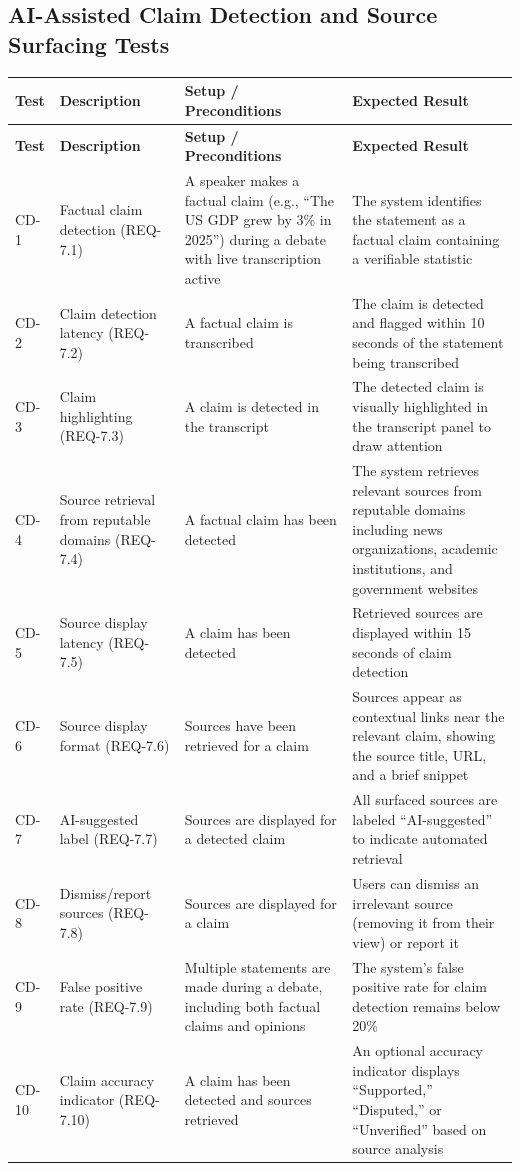 \documentclass[12pt]{article}
\begin{document}
\subsection{AI-Assisted Claim Detection and Source Surfacing Tests}

\begin{longtable}{|p{1.5cm}|p{3cm}|p{4cm}|p{4cm}|}
\hline
\textbf{Test} & \textbf{Description} & \textbf{Setup / Preconditions} & \textbf{Expected Result} \\
\hline
\endfirsthead
\hline
\textbf{Test} & \textbf{Description} & \textbf{Setup / Preconditions} & \textbf{Expected Result} \\
\hline
\endhead
CD-1 & Factual claim detection (REQ-7.1) & A speaker makes a factual claim (e.g., ``The US GDP grew by 3\% in 2025'') during a debate with live transcription active & The system identifies the statement as a factual claim containing a verifiable statistic \\
\hline
CD-2 & Claim detection latency (REQ-7.2) & A factual claim is transcribed & The claim is detected and flagged within 10 seconds of the statement being transcribed \\
\hline
CD-3 & Claim highlighting (REQ-7.3) & A claim is detected in the transcript & The detected claim is visually highlighted in the transcript panel to draw attention \\
\hline
CD-4 & Source retrieval from reputable domains (REQ-7.4) & A factual claim has been detected & The system retrieves relevant sources from reputable domains including news organizations, academic institutions, and government websites \\
\hline
CD-5 & Source display latency (REQ-7.5) & A claim has been detected & Retrieved sources are displayed within 15 seconds of claim detection \\
\hline
CD-6 & Source display format (REQ-7.6) & Sources have been retrieved for a claim & Sources appear as contextual links near the relevant claim, showing the source title, URL, and a brief snippet \\
\hline
CD-7 & AI-suggested label (REQ-7.7) & Sources are displayed for a detected claim & All surfaced sources are labeled ``AI-suggested'' to indicate automated retrieval \\
\hline
CD-8 & Dismiss/report sources (REQ-7.8) & Sources are displayed for a claim & Users can dismiss an irrelevant source (removing it from their view) or report it \\
\hline
CD-9 & False positive rate (REQ-7.9) & Multiple statements are made during a debate, including both factual claims and opinions & The system's false positive rate for claim detection remains below 20\% \\
\hline
CD-10 & Claim accuracy indicator (REQ-7.10) & A claim has been detected and sources retrieved & An optional accuracy indicator displays ``Supported,'' ``Disputed,'' or ``Unverified'' based on source analysis \\
\hline
\end{longtable}
\end{document}
